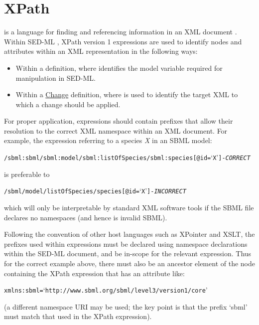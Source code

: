 \section{XPath}  
\label{sec:xpath}
 is a language for finding and referencing information in an XML document \citep{xpath:1999}. Within SED-ML \currentLV, XPath version 1 expressions are used to identify nodes and attributes within an XML representation in the following ways:

\begin{itemize}
	\item {Within a \Variable definition, where  identifies the model variable required for manipulation in SED-ML.}
	\item {Within a \hyperref[class:change]{Change} definition, where  is used to identify the target XML to which a change should be applied.}
\end{itemize}

For proper application,  expressions should contain prefixes that allow their resolution to the correct XML namespace within an XML document. For example, the  expression referring to a species \emph{X} in an SBML model:
\begin{alltt}
/sbml:sbml/sbml:model/sbml:listOfSpecies/sbml:species[@id=`X'] {\tickYes -\emph{CORRECT}}
\end{alltt}
is preferable to 
\begin{alltt}
/sbml/model/listOfSpecies/species[@id=`X'] {\tickNo -\emph{INCORRECT} }
\end{alltt}

which will only be interpretable by standard XML software tools if the SBML file declares no namespaces (and hence is invalid SBML).

Following the convention of other  host languages such as XPointer and XSLT, the prefixes used within  expressions must be declared using namespace declarations within the SED-ML document, and be in-scope for the relevant expression. Thus for the correct example above, there must also be an ancestor element of the node containing the XPath expression that has an attribute like:
\begin{alltt}
xmlns:sbml=`http://www.sbml.org/sbml/level3/version1/core'
\end{alltt}
(a different namespace URI may be used; the key point is that the prefix `sbml' must match that used in the XPath expression).


